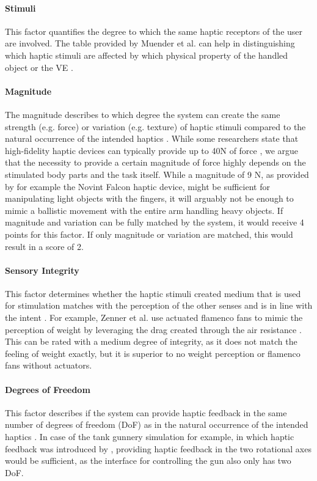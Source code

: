 \paragraph{Stimuli}
This factor quantifies the degree to which the same haptic receptors of the user are involved. The table provided by Muender et al. can help in distinguishing which haptic stimuli are affected by which physical property of the handled object or the VE \cite{Muender2022HapticReality}.

\paragraph{Magnitude}
The magnitude describes to which degree the system can create the same strength (e.g. force) or variation (e.g. texture) of haptic stimuli compared to the natural occurrence of the intended haptics \cite{Muender2022HapticReality}. While some researchers state that high-fidelity haptic devices can typically provide up to 40N of force \cite{Grant2019}, we argue that the necessity to provide a certain magnitude of force highly depends on the stimulated body parts and the task itself. While a magnitude of 9 N, as provided by for example the Novint Falcon haptic device, might be sufficient for manipulating light objects with the fingers, it will arguably not be enough to mimic a ballistic movement with the entire arm handling heavy objects.
If magnitude and variation can be fully matched by the system, it would receive 4 points for this factor. If only magnitude or variation are matched, this would result in a score of 2.

\paragraph{Sensory Integrity}
This factor determines whether the haptic stimuli created medium that is used for stimulation matches with the perception of the other senses and is in line with the intent \cite{Muender2022HapticReality}. For example, Zenner et al. use actuated flamenco fans to mimic the perception of weight by leveraging the drag created through the air resistance \cite{Zenner2019}. This can be rated with a medium degree of integrity, as it does not match the feeling of weight exactly, but it is superior to no weight perception or flamenco fans without actuators. 

\paragraph{Degrees of Freedom}
This factor describes if the system can provide haptic feedback in the same number of degrees of freedom (DoF) as in the natural occurrence of the intended haptics \cite{Muender2022HapticReality}. In case of the tank gunnery simulation for example, in which haptic feedback was introduced by \cite{LiuG2014}, providing haptic feedback in the two rotational axes would be sufficient, as the interface for controlling the gun also only has two DoF.

